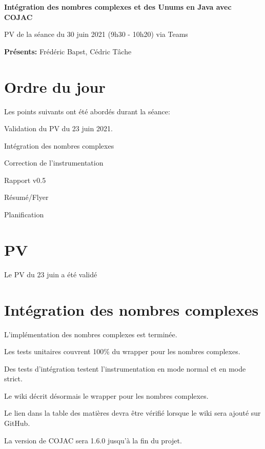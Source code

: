 \documentclass[11pt]{meetingmins}
\date{30 juin 2021}
\begin{document}
\begin {center} {
    \large \textbf {Intégration des nombres complexes et des Unums en Java avec COJAC}
}
\vspace {0.5ex}

PV de la séance du 30 juin 2021 (9h30 - 10h20) via Teams
\end {center} \vspace {1.5em}

\noindent
\textbf{Présents:} Frédéric Bapst, Cédric Tâche

\section{Ordre du jour}
Les points suivants ont été abordés durant la séance:
\begin{hiddenitems}
    \item Validation du PV du 23 juin 2021.
    \item Intégration des nombres complexes
    \item Correction de l'instrumentation
    \item Rapport v0.5
    \item Résumé/Flyer
    \item Planification
\end{hiddenitems}

\section{PV}
\begin{hiddenitems}
    \item Le PV du 23 juin a été validé
\end{hiddenitems}

\section{Intégration des nombres complexes}
\begin{hiddenitems}
    \item L'implémentation des nombres complexes est terminée.
    \item Les tests unitaires couvrent 100\% du wrapper pour les nombres complexes.
    \item Des tests d'intégration testent l'instrumentation en mode normal et en mode strict.
    \item Le wiki décrit désormais le wrapper pour les nombres complexes.
    \item Le lien dans la table des matières devra être vérifié lorsque le wiki sera ajouté sur GitHub.
    \item La version de COJAC sera 1.6.0 jusqu'à la fin du projet.
\end{hiddenitems}
\end{document}
